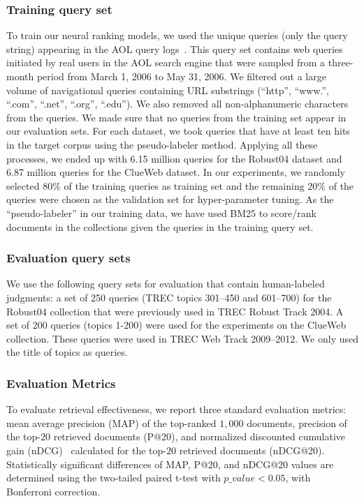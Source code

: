 \subsubsection{Training query set}
\label{sec:query_set}
To train our neural ranking models, we used the unique queries (only the query string) appearing in the AOL query logs~\citep{Pass:2006}. This query set contains web queries initiated by real users in the AOL search engine that were sampled from a three-month period from March 1, 2006 to May 31, 2006. We filtered out a large volume of navigational queries containing URL substrings (``http'', ``www.'', ``.com'', ``.net'', ``.org'', ``.edu''). We also removed all non-alphanumeric characters from the queries. We made sure that no queries from the training set appear in our evaluation sets. For each dataset, we took queries that have at least ten hits in the target corpus using the pseudo-labeler method. Applying all these processes, we ended up with 6.15 million queries for the Robust04 dataset and 6.87 million queries for the ClueWeb dataset. 
In our experiments, we randomly selected $80\%$ of the training queries as training set and the remaining $20\%$ of the queries were chosen as the validation set for hyper-parameter tuning. As the ``pseudo-labeler'' in our training data, we have used BM25 to score/rank documents in the collections given the queries in the training query set.

\subsubsection{Evaluation query sets} 
We use the following query sets for evaluation that contain human-labeled judgments: a set of 250 queries (TREC topics 301--450 and 601--700) for the Robust04 collection that were previously used in TREC Robust Track 2004. A set of 200 queries (topics 1-200) were used for the experiments on the ClueWeb collection. These queries were used in TREC Web Track 2009--2012. We only used the title of topics as queries.

\subsubsection{Evaluation Metrics}
To evaluate retrieval effectiveness, we report three standard evaluation metrics: mean average precision (MAP) of the top-ranked $1,000$ documents, precision of the top-$20$ retrieved documents (P@20), and normalized discounted cumulative gain (nDCG)~\citep{Jarvelin:2002} calculated for the top-$20$ retrieved documents (nDCG@20). Statistically significant differences of MAP, P@20, and nDCG@20 values are determined using the two-tailed paired t-test with $p\_value<0.05$, with Bonferroni correction.


